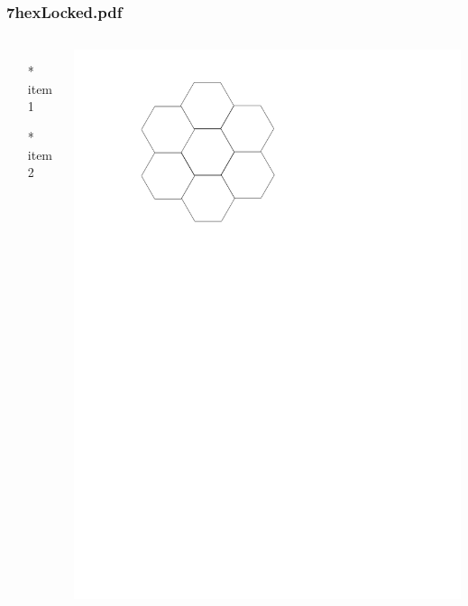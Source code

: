 \begin{frame} \frametitle{7hexLocked.pdf}
    \begin{columns}[c]
        \begin{itemize}
            \item[*] item 1
            \item[*] item 2
        \end{itemize}
        \begin{minipage}{\linewidth}
            \begin{center}
            \includegraphics[width=.9\textwidth]{graphics/7hexLocked.pdf}
            \label{gfx:7hexLocked.pdf}
            \end{center}
        \end{minipage}
    \end{columns}
\end{frame}
